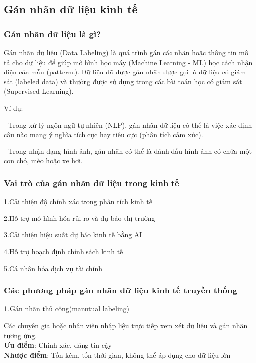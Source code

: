 \documentclass{article} %
\begin{document}
\subsection{Gán nhãn dữ liệu kinh tế} 

\subsubsection{Gán nhãn dữ liệu là gì?}
Gán nhãn dữ liệu (Data Labeling) là quá trình gán các nhãn hoặc thông tin mô tả cho dữ liệu để giúp mô hình 
học máy (Machine Learning - ML) học cách nhận diện các mẫu (patterns). Dữ liệu đã được gán nhãn được gọi là dữ liệu 
có giám sát (labeled data) và thường được sử dụng trong các bài toán học có giám sát (Supervised Learning).

Ví dụ: 

\hspace{10pt}- Trong xử lý ngôn ngữ tự nhiên (NLP), gán nhãn dữ liệu có thể là việc xác định câu nào mang ý nghĩa tích cực hay tiêu cực (phân tích cảm xúc).

\hspace{10pt}- Trong nhận dạng hình ảnh, gán nhãn có thể là đánh dấu hình ảnh có chứa một con chó, mèo hoặc xe hơi.

\subsubsection{Vai trò của gán nhãn dữ liệu trong kinh tế}
\hspace{10pt} 1.Cải thiện độ chính xác trong phân tích kinh tế

2.Hỗ trợ mô hình hóa rủi ro và dự báo thị trường

3.Cải thiện hiệu suất dự báo kinh tế bằng AI

4.Hỗ trợ hoạch định chính sách kinh tế

5.Cá nhân hóa dịch vụ tài chính

\subsubsection{Các phương pháp gán nhãn dữ liệu kinh tế truyền thống}

\textbf{1}.Gán nhãn thủ công(manutual labeling)

\hspace{10pt} Các chuyên gia hoặc nhân viên nhập liệu trực tiếp xem xét dữ liệu và gán nhãn tương ứng.\\
\textbf{Ưu điểm}: Chính xác, đáng tin cậy\\
\textbf{Nhược điểm}: Tốn kém, tốn thời gian, không thể áp dụng cho dữ liệu lớn
\end{document}
